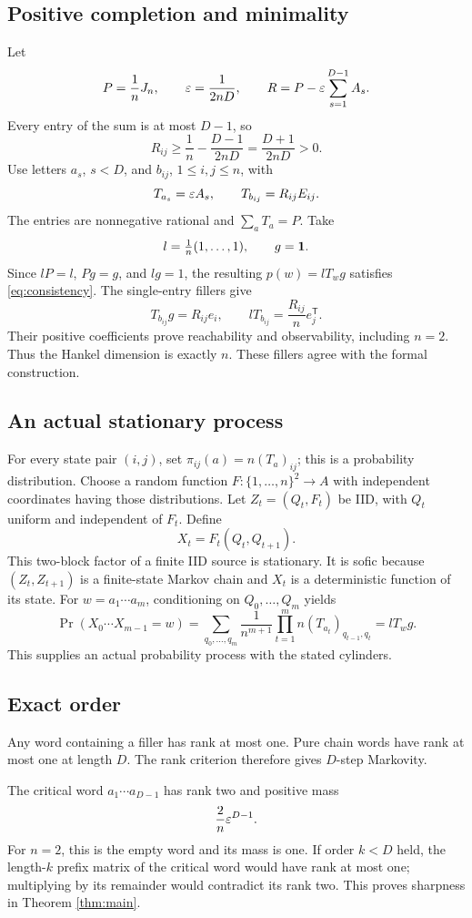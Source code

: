 \subsection{Positive completion and minimality}
Let
\[
 P=\frac1nJ_n,\qquad \varepsilon=\frac1{2nD},\qquad
 R=P-\varepsilon\sum_{s=1}^{D-1}A_s.
\]
Every entry of the sum is at most \(D-1\), so
\[
 R_{ij}\ge\frac1n-\frac{D-1}{2nD}=\frac{D+1}{2nD}>0.
\]
Use letters \(a_s\), \(s<D\), and \(b_{ij}\), \(1\le i,j\le n\), with
\[
 T_{a_s}=\varepsilon A_s,\qquad T_{b_{ij}}=R_{ij}E_{ij}.
\]
The entries are nonnegative rational and \(\sum_aT_a=P\). Take
\[
 l=\tfrac1n(1,\ldots,1),\qquad g=\mathbf 1.
\]
Since \(lP=l\), \(Pg=g\), and \(lg=1\), the resulting \(p(w)=lT_wg\) satisfies \eqref{eq:consistency}. The single-entry fillers give
\[
 T_{b_{ij}}g=R_{ij}e_i,\qquad
 lT_{b_{ij}}=\frac{R_{ij}}n e_j^{\mathsf T}.
\]
Their positive coefficients prove reachability and observability, including \(n=2\). Thus the Hankel dimension is exactly \(n\). These fillers agree with the formal construction.

\subsection{An actual stationary process}
For every state pair \((i,j)\), set \(\pi_{ij}(a)=n(T_a)_{ij}\); this is a probability distribution. Choose a random function \(F:\{1,\ldots,n\}^2\to A\) with independent coordinates having those distributions. Let \(Z_t=(Q_t,F_t)\) be IID, with \(Q_t\) uniform and independent of \(F_t\). Define
\[
 X_t=F_t(Q_t,Q_{t+1}).
\]
This two-block factor of a finite IID source is stationary. It is sofic because \((Z_t,Z_{t+1})\) is a finite-state Markov chain and \(X_t\) is a deterministic function of its state. For \(w=a_1\cdots a_m\), conditioning on \(Q_0,\ldots,Q_m\) yields
\[
 \Pr(X_0\cdots X_{m-1}=w)
 =\sum_{q_0,\ldots,q_m}\frac1{n^{m+1}}
   \prod_{t=1}^{m}n(T_{a_t})_{q_{t-1},q_t}
 =lT_wg.
\]
This supplies an actual probability process with the stated cylinders.

\subsection{Exact order}
Any word containing a filler has rank at most one. Pure chain words have rank at most one at length \(D\). The rank criterion therefore gives \(D\)-step Markovity.

The critical word \(a_1\cdots a_{D-1}\) has rank two and positive mass
\[
 \frac2n\varepsilon^{D-1}.
\]
For \(n=2\), this is the empty word and its mass is one. If order \(k<D\) held, the length-\(k\) prefix matrix of the critical word would have rank at most one; multiplying by its remainder would contradict its rank two. This proves sharpness in Theorem \ref{thm:main}.

